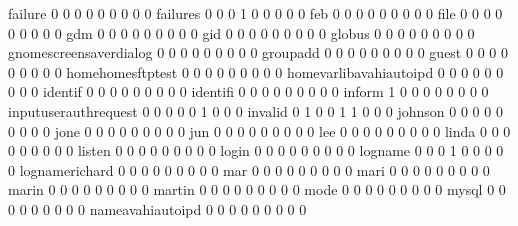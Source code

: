 \documentclass[compress,8pt]{beamer}
\begin{document}
\begin{frame}
\begin{Schunk}
  failure                                    0   0   0   0   0   0   0   0   0
  failures                                   0   0   0   1   0   0   0   0   0
  feb                                        0   0   0   0   0   0   0   0   0
  file                                       0   0   0   0   0   0   0   0   0
  gdm                                        0   0   0   0   0   0   0   0   0
  gid                                        0   0   0   0   0   0   0   0   0
  globus                                     0   0   0   0   0   0   0   0   0
  gnomescreensaverdialog                     0   0   0   0   0   0   0   0   0
  groupadd                                   0   0   0   0   0   0   0   0   0
  guest                                      0   0   0   0   0   0   0   0   0
  homehomesftptest                           0   0   0   0   0   0   0   0   0
  homevarlibavahiautoipd                     0   0   0   0   0   0   0   0   0
  identif                                    0   0   0   0   0   0   0   0   0
  identifi                                   0   0   0   0   0   0   0   0   0
  inform                                     1   0   0   0   0   0   0   0   0
  inputuserauthrequest                       0   0   0   0   0   1   0   0   0
  invalid                                    0   1   0   0   1   1   0   0   0
  johnson                                    0   0   0   0   0   0   0   0   0
  jone                                       0   0   0   0   0   0   0   0   0
  jun                                        0   0   0   0   0   0   0   0   0
  lee                                        0   0   0   0   0   0   0   0   0
  linda                                      0   0   0   0   0   0   0   0   0
  listen                                     0   0   0   0   0   0   0   0   0
  login                                      0   0   0   0   0   0   0   0   0
  logname                                    0   0   0   1   0   0   0   0   0
  lognamerichard                             0   0   0   0   0   0   0   0   0
  mar                                        0   0   0   0   0   0   0   0   0
  mari                                       0   0   0   0   0   0   0   0   0
  marin                                      0   0   0   0   0   0   0   0   0
  martin                                     0   0   0   0   0   0   0   0   0
  mode                                       0   0   0   0   0   0   0   0   0
  mysql                                      0   0   0   0   0   0   0   0   0
  nameavahiautoipd                           0   0   0   0   0   0   0   0   0

\end{Schunk}
\end{frame}
\end{document}
